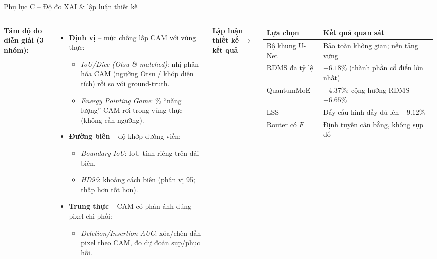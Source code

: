 \documentclass[aspectratio=169,11pt]{beamer}
\newcommand{\hl}[1]{\textcolor{hcmusblue}{\textbf{#1}}}
\begin{document}
\begin{frame}{Phụ lục C -- Độ đo XAI \& lập luận thiết kế}
  \begin{columns}[T]
      \textbf{\small Tám độ đo diễn giải (3 nhóm):}
      \begin{itemize}\footnotesize
        \item \hl{Định vị} -- mức chồng lấp CAM với vùng thực:
          \begin{itemize}\scriptsize
            \item \emph{IoU/Dice (Otsu \& matched)}: nhị phân hóa CAM (ngưỡng Otsu / khớp diện tích) rồi so với ground-truth.
            \item \emph{Energy Pointing Game}: \% ``năng lượng'' CAM rơi trong vùng thực (không cần ngưỡng).
          \end{itemize}
        \item \hl{Đường biên} -- độ khớp đường viền:
          \begin{itemize}\scriptsize
            \item \emph{Boundary IoU}: IoU tính riêng trên dải biên.
            \item \emph{HD95}: khoảng cách biên (phân vị 95; thấp hơn tốt hơn).
          \end{itemize}
        \item \hl{Trung thực} -- CAM có phản ánh đúng pixel chi phối:
          \begin{itemize}\scriptsize
            \item \emph{Deletion/Insertion AUC}: xóa/chèn dần pixel theo CAM, đo dự đoán sụp/phục hồi.
          \end{itemize}
      \end{itemize}
      \centering\scriptsize \textbf{Lập luận thiết kế $\to$ kết quả}\\[0.2em]
      \renewcommand{\arraystretch}{1.2}
      \begin{tabular}{@{}>{\raggedright\arraybackslash}p{2.4cm}>{\raggedright\arraybackslash}p{4.0cm}@{}}
        \toprule
        \textbf{Lựa chọn} & \textbf{Kết quả quan sát} \\
        \midrule
        Bộ khung U-Net & Bảo toàn không gian; nền tảng vững \\
        RDMS đa tỷ lệ & $+6.18\%$ (thành phần cổ điển lớn nhất) \\
        QuantumMoE & $+4.37\%$; cộng hưởng RDMS $+6.65\%$ \\
        LSS & Đẩy cấu hình đầy đủ lên $+9.12\%$ \\
        Router có $F$ & Định tuyến cân bằng, không sụp đổ \\
        \bottomrule
      \end{tabular}
  \end{columns}
\end{frame}
\end{document}
